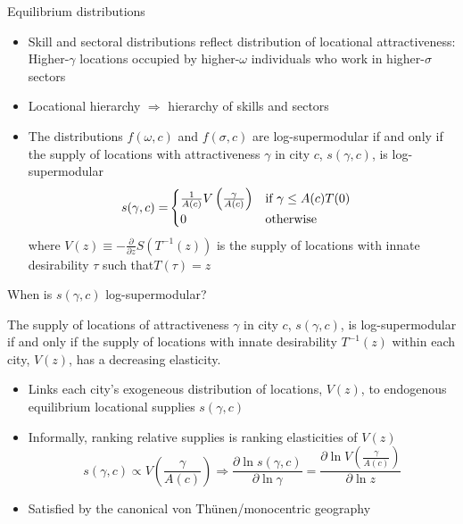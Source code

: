\documentclass[10pt,notes=hide]{beamer}
\begin{document}
\begin{frame}{Equilibrium distributions}
\begin{itemize}
\item Skill and sectoral distributions reflect distribution of locational
attractiveness: Higher-$\gamma$ locations occupied by higher-$\omega$
individuals who work in higher-$\sigma$ sectors
\item Locational hierarchy $\Rightarrow$ hierarchy of skills and sectors
\item The distributions $f(\omega,c)$ and $f(\sigma,c)$ are log-supermodular
if and only if the supply of locations with attractiveness $\gamma$
in city $c$, $s(\gamma,c)$, is log-supermodular 
\begin{align*}
s(\gamma,c)= & \begin{cases}
\frac{1}{A(c)}V\left(\frac{\gamma}{A(c)}\right) & \textnormal{if }\gamma\leq A(c)T(0)\\
0 & \textnormal{otherwise}
\end{cases}
\end{align*}
where\textrm{ $V(z)\equiv-\frac{\partial}{\partial z}S\left(T^{-1}(z)\right)$
is }the supply of locations with innate desirability $\tau$ such
that$T(\tau)=z$
\end{itemize}
\end{frame}
\begin{frame}{When is $s(\gamma,c)$ log-supermodular?}
\begin{proposition}
\label{prop:LocationDistribution}The supply of locations of attractiveness
$\gamma$ in city $c$, $s(\gamma,c)$, is log-supermodular if and
only if the supply of locations with innate desirability \textrm{\textup{$T^{-1}(z)$}}
within each city, $V(z)$, has a decreasing elasticity.\end{proposition}
\begin{itemize}
\item Links each city's exogeneous distribution of locations, $V(z)$, to
endogenous equilibrium locational supplies $s(\gamma,c)$
\item Informally, ranking relative supplies is ranking elasticities of $V(z)$
\[
s(\gamma,c)\propto V\left(\frac{\gamma}{A(c)}\right)\Rightarrow\frac{\partial\ln s(\gamma,c)}{\partial\ln\gamma}=\frac{\partial\ln V\left(\frac{\gamma}{A(c)}\right)}{\partial\ln z}
\]
\item Satisfied by the canonical von Th\"{u}nen/monocentric geography
\end{itemize}
\end{frame}
\end{document}
